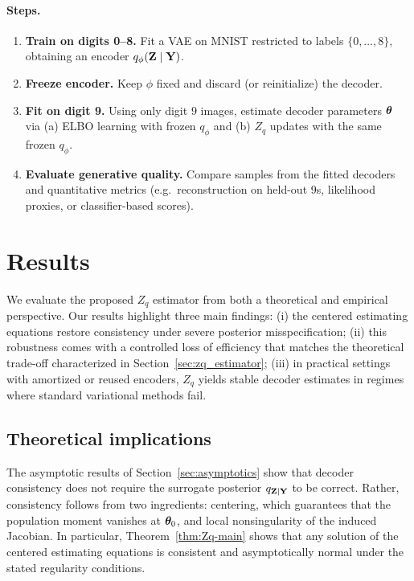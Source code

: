 \documentclass[twoside,11pt]{article}
\begin{document}
\paragraph{Steps.}
\begin{enumerate}
\item \textbf{Train on digits 0--8.} Fit a VAE on MNIST restricted to labels $\{0,\dots,8\}$, obtaining an encoder $q_{\phi}({\bf Z}\mid{\bf Y})$.
\item \textbf{Freeze encoder.} Keep $\phi$ fixed and discard (or reinitialize) the decoder.
\item \textbf{Fit on digit 9.} Using only digit $9$ images, estimate decoder parameters ${\bm{\theta}}$ via (a) ELBO learning with frozen $q_{\phi}$ and (b) $Z_q$ updates with the same frozen $q_{\phi}$.
\item \textbf{Evaluate generative quality.} Compare samples from the fitted decoders and quantitative metrics (e.g.\ reconstruction on held-out 9s, likelihood proxies, or classifier-based scores).
\end{enumerate}






\section{Results}
\label{sec:results}

We evaluate the proposed $Z_q$ estimator from both a theoretical and empirical
perspective.  Our results highlight three main findings:  
(i) the centered estimating equations restore consistency under severe posterior
misspecification;  
(ii) this robustness comes with a controlled loss of efficiency that matches the
theoretical trade-off characterized in Section~\ref{sec:zq_estimator};  
(iii) in practical settings with amortized or reused encoders, $Z_q$ yields stable
decoder estimates in regimes where standard variational methods fail.


\subsection{Theoretical implications}

The asymptotic results of Section~\ref{sec:asymptotics} show that decoder
consistency does not require the surrogate posterior $q_{{\bf Z}\mid{\bf Y}}$ to be correct.
Rather, consistency follows from two ingredients: centering, which guarantees that
the population moment vanishes at ${\bm{\theta}}_0$, and local nonsingularity of the induced
Jacobian. In particular, Theorem~\ref{thm:Zq-main} shows that any solution of the
centered estimating equations is consistent and asymptotically normal under the
stated regularity conditions.
\end{document}
